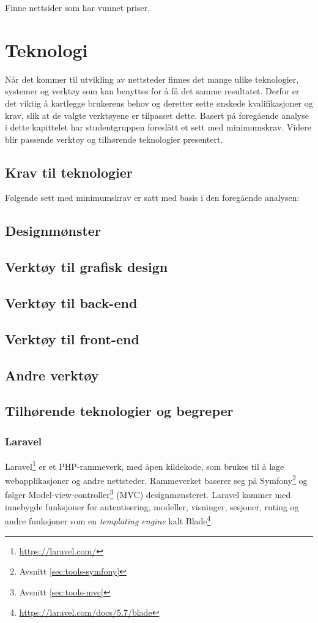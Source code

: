 Finne nettsider som har vunnet priser.


\section{Teknologi}
Når det kommer til utvikling av nettsteder finnes det mange ulike teknologier, systemer og verktøy som kan benyttes for å få det samme resultatet. Derfor er det viktig å kartlegge brukerens behov og deretter sette ønskede kvalifikasjoner og krav, slik at de valgte verktøyene er tilpasset dette. Basert på foregående analyse i dette kapittelet har studentgruppen foreslått et sett med minimumskrav. Videre blir passende verktøy og tilhørende teknologier presentert.

\subsection{Krav til teknologier}
Følgende sett med minimumskrav er satt med basis i den foregående analysen:


\subsection{Designmønster}
\subsection{Verktøy til grafisk design}
\subsection{Verktøy til back-end}
\subsection{Verktøy til front-end}
\subsection{Andre verktøy}
\subsection{Tilhørende teknologier og begreper}

\subsubsection{Laravel}
Laravel\footnote{\url{https://laravel.com/}} er et PHP-rammeverk, med åpen kildekode, som brukes til å lage webapplikasjoner og andre nettsteder. Rammeverket baserer seg på Symfony\footnote{Avsnitt \ref{sec:tools-symfony}} og følger Model-view-controller\footnote{Avsnitt \ref{sec:tools-mvc}} (MVC) designmønsteret.
Laravel kommer med innebygde funksjoner for autentisering, modeller, visninger, sesjoner, ruting og andre funksjoner som en \textit{templating engine} kalt Blade\footnote{\url{https://laravel.com/docs/5.7/blade}}.


